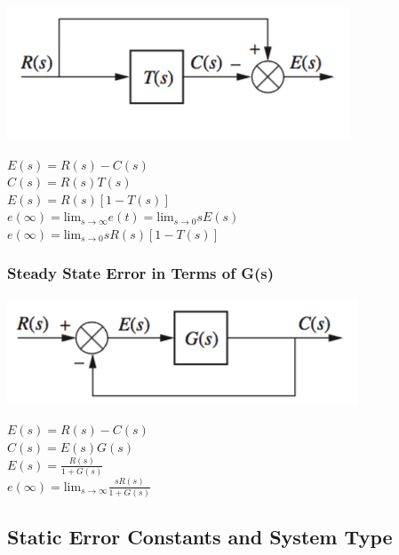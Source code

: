 \documentclass[11pt]{article}
\begin{document}
    \begin{center}
        \includegraphics[width=300 px]{img/closedlooperror} \\
    \end{center}

    \begin{center}
        $E(s) = R(s) - C(s)$ \\
        $C(s) = R(s)T(s)$ \\ 
        $E(s) = R(s)[1 - T(s)]$ \\
        $e(\infty) = \text{lim}_{s\rightarrow \infty}  e(t) = \text{lim}_{s\rightarrow 0}  sE(s)$ \\ 
        $e(\infty) = \text{lim}_{s\rightarrow 0} sR(s)[1 - T(s)]$ \\
    \end{center}

    \subsubsection{Steady State Error in Terms of G(s)}

    \begin{center}
        \includegraphics[width=300 px]{img/unityfeedback} \\
    \end{center}

    \begin{center}
        $E(s) = R(s) - C(s)$ \\
        $C(s) = E(s)G(s)$ \\ 
        $E(s) = \frac{R(s)}{1 + G(s)}$ \\
        $e(\infty) = \text{lim}_{s\rightarrow \infty} \frac{sR(s)}{1 + G(s)} $ \\ 
    \end{center}

    \subsection{Static Error Constants and System Type}
\end{document}

